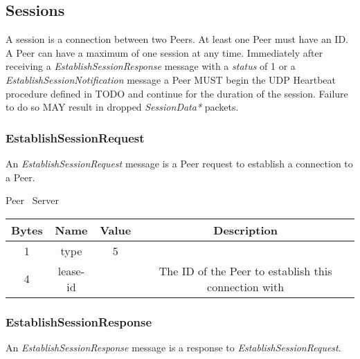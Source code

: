 \documentclass{article}
\begin{document}
    \subsection{Sessions}

    A session is a connection between two Peers. At least one Peer must have an ID. A Peer can have a maximum of one
    session at any time. Immediately after receiving a \emph{EstablishSessionResponse} message with a \emph{status}
    of 1 or a \emph{EstablishSessionNotification} message a Peer MUST begin the UDP Heartbeat procedure defined in %
    TODO
    and continue for the duration of the session. Failure to do so MAY result in dropped \emph{SessionData*} packets.

    \subsubsection{EstablishSessionRequest}

    An \emph{EstablishSessionRequest} message is a Peer request to establish a connection to a Peer.

    \begin{center}
        Peer \textrightarrow\ Server\\
        \begin{tabular}{|c|c|c|c|}
            \hline
            \textbf{Bytes} & \textbf{Name} & \textbf{Value} & \textbf{Description}                                 \\
            \hline
            1              & type          & 5              &                                                      \\
            \hline
            4              & lease-id      &                & The ID of the Peer to establish this connection with \\
            \hline
        \end{tabular}
    \end{center}

    \subsubsection{EstablishSessionResponse}

    An \emph{EstablishSessionResponse} message is a response to \emph{EstablishSessionRequest}.
\end{document}

